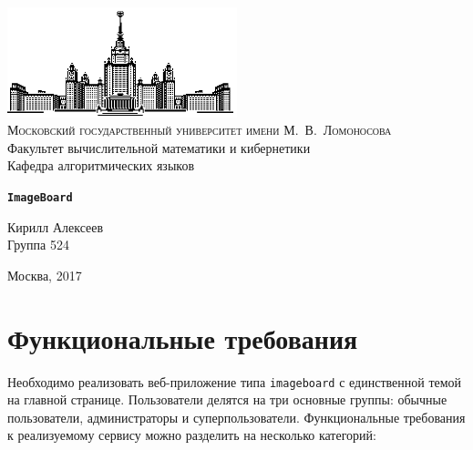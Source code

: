 \documentclass[oneside, final, 14pt]{extarticle}
\begin{document}
\thispagestyle{empty}

\begin{center}
\ \vspace{-3cm}

\includegraphics[width=0.5\textwidth]{msu.eps}\\
{\scshape Московский государственный университет имени М.~В.~Ломоносова}\\
Факультет вычислительной математики и кибернетики\\
Кафедра алгоритмических языков

\vfill

\vspace{7mm}

{\Large \bfseries \texttt{ImageBoard}\\}

\vspace{5mm}

\end{center}

\vspace{5cm}

\begin{flushright}
Кирилл Алексеев\\
Группа 524
\end{flushright}

\vfill

\centerline {Москва, 2017}

\clearpage

\begingroup
\let\clearpage\relax
\tableofcontents
\endgroup

\clearpage

\section{Функциональные требования}

Необходимо реализовать веб-приложение типа \texttt{imageboard} с единственной темой на главной странице. Пользователи делятся на три основные группы: обычные пользователи, администраторы и суперпользователи. Функциональные требования к реализуемому сервису можно разделить на несколько категорий:
\end{document}
